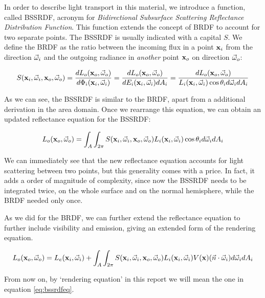 In order to describe light transport in this material, we introduce a function, called BSSRDF, acronym for \emph{Bidirectional Subsurface Scattering Reflectance Distribution Function}. This function extends the concept of BRDF to account for two separate points. The BSSRDF is usually indicated with a capital $S$. We define the BRDF as the ratio between the incoming flux in a point $\mathbf{x}_i$ from the direction $\vec{\omega}_i$ and the outgoing radiance in \emph{another} point $\mathbf{x}_o$ on direction $\vec{\omega}_o$:

$$
S(\mathbf{x}_i, \vec{\omega}_i, \mathbf{x}_o, \vec{\omega}_o) = \frac{d L_o(\mathbf{x}_o,\vec{\omega}_o)}{d \Phi_i(\mathbf{x}_i,\vec{\omega}_i)} = \frac{d L_o(\mathbf{x}_o,\vec{\omega}_o)}{d E_i(\mathbf{x}_i,\vec{\omega}_i) d A_i} = \frac{d L_o(\mathbf{x}_o,\vec{\omega}_o)}{L_i(\mathbf{x}_i,\vec{\omega}_i) \cos \theta_i d\vec{\omega}_i d A_i}  
$$

As we can see, the BSSRDF is similar to the BRDF, apart from a additional derivation in the area domain. Once we rearrange this equation, we can obtain an updated reflectance equation for the BSSRDF:

$$
L_o(\mathbf{x}_o,\vec{\omega}_o) = \int_A \int_{2\pi} S(\mathbf{x}_i, \vec{\omega}_i, \mathbf{x}_o, \vec{\omega}_o) L_i(\mathbf{x}_i,\vec{\omega}_i) \cos \theta_i d\vec{\omega}_i d A_i
$$

We can immediately see that the new reflectance equation accounts for light scattering between two points, but this generality comes with a price. In fact, it adds a order of magnitude of complexity, since now the BSSRDF needs to be integrated twice, on the whole surface and on the normal hemisphere, while the BRDF needed only once. 

As we did for the BRDF, we can further extend the reflectance equation to further include visibility and emission, giving an extended form of the rendering equation. 

\begin{equation}
L_o(\mathbf{x}_o,\vec{\omega}_o) = L_e(\mathbf{x}_i,\vec{\omega}_i) + \int_A \int_{2\pi} S(\mathbf{x}_i, \vec{\omega}_i, \mathbf{x}_o, \vec{\omega}_o) L_i(\mathbf{x}_i,\vec{\omega}_i) V(\mathbf{x}) (\vec{n} \cdot \vec{\omega}_i) d\vec{\omega}_i d A_i
\label{eq:bssrdfeq}
\end{equation}

From now on, by `rendering equation' in this report we will mean the one in equation \ref{eq:bssrdfeq}. 


